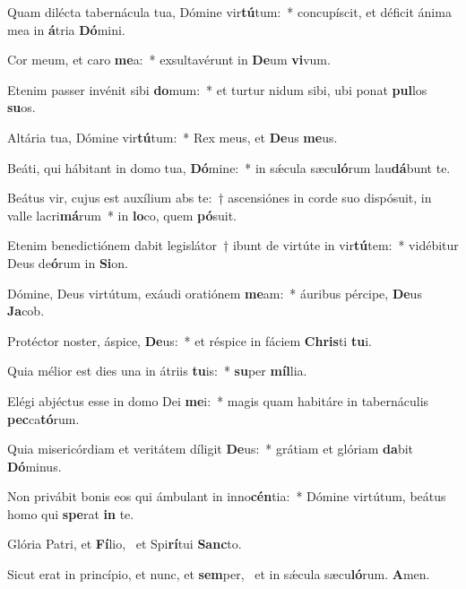 \item Quam dilécta tabernácula tua, Dómine vir\textbf{tú}tum:~* concupíscit, et déficit ánima mea in \textbf{á}tria \textbf{Dó}mini.
\item Cor meum, et caro \textbf{me}a:~* exsultavérunt in \textbf{De}um \textbf{vi}vum.
\item Etenim passer invénit sibi \textbf{do}mum:~* et turtur nidum sibi, ubi ponat \textbf{pul}los \textbf{su}os.
\item Altária tua, Dómine vir\textbf{tú}tum:~* Rex meus, et \textbf{De}us \textbf{me}us.
\item Beáti, qui hábitant in domo tua, \textbf{Dó}mine:~* in sǽcula sæcu\textbf{ló}rum lau\textbf{dá}bunt te.
\item Beátus vir, cujus est auxílium abs te:~† ascensiónes in corde suo dispósuit, in valle lacri\textbf{má}rum~* in \textbf{lo}co, quem \textbf{pó}suit.
\item Etenim benedictiónem dabit legislátor~† ibunt de virtúte in vir\textbf{tú}tem:~* vidébitur Deus de\textbf{ó}rum in \textbf{Si}on.
\item Dómine, Deus virtútum, exáudi oratiónem \textbf{me}am:~* áuribus pércipe, \textbf{De}us \textbf{Ja}cob.
\item Protéctor noster, áspice, \textbf{De}us:~* et réspice in fáciem \textbf{Chris}ti \textbf{tu}i.
\item Quia mélior est dies una in átriis \textbf{tu}is:~* \textbf{su}per \textbf{míl}lia.
\item Elégi abjéctus esse in domo Dei \textbf{me}i:~* magis quam habitáre in tabernáculis \textbf{pec}ca\textbf{tó}rum.
\item Quia misericórdiam et veritátem díligit \textbf{De}us:~* grátiam et glóriam \textbf{da}bit \textbf{Dó}minus.
\item Non privábit bonis eos qui ámbulant in inno\textbf{cén}tia:~* Dómine virtútum, beátus homo qui \textbf{spe}rat \textbf{in} te.
\item Glória Patri, et \textbf{Fí}lio,~\psstar{} et Spi\textbf{rí}tui \textbf{Sanc}to.
\item Sicut erat in princípio, et nunc, et \textbf{sem}per,~\psstar{} et in sǽcula sæcu\textbf{ló}rum. \textbf{A}men.
